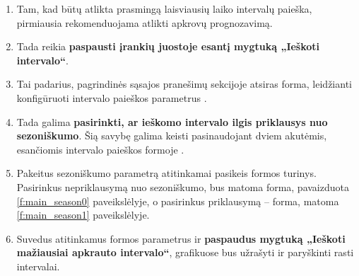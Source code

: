 \begin{enumerate}
  \item Tam, kad būtų atlikta prasmingą laisviausių laiko intervalų
    paieška, pirmiausia rekomenduojama atlikti apkrovų prognozavimą.
  \item Tada reikia \textbf{paspausti įrankių juostoje 
    esantį mygtuką „Ieškoti intervalo“}.
  \item Tai padarius, pagrindinės sąsajos pranešimų sekcijoje
    atsiras forma, leidžianti konfigūruoti intervalo paieškos
    parametrus .
  \item Tada galima \textbf{pasirinkti, ar ieškomo intervalo ilgis
    priklausys nuo sezoniškumo}. Šią savybę galima keisti
    pasinaudojant dviem akutėmis, esančiomis intervalo paieškos
    formoje .
  \item Pakeitus sezoniškumo parametrą atitinkamai pasikeis formos
    turinys. Pasirinkus nepriklausymą nuo sezoniškumo, bus matoma forma,
    pavaizduota \ref{f:main_season0} paveikslėlyje, o pasirinkus 
    priklausymą – forma, matoma \ref{f:main_season1} paveikslėlyje.
  \item Suvedus atitinkamus formos parametrus ir \textbf{paspaudus
    mygtuką „Ieškoti mažiausiai apkrauto intervalo“}, grafikuose bus
    užrašyti ir paryškinti rasti intervalai.
\end{enumerate}
